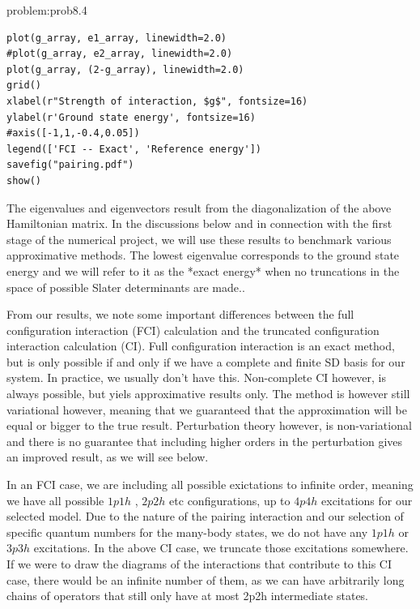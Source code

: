 \begin{sol}{problem:prob8.4}
\begin{lstlisting}
plot(g_array, e1_array, linewidth=2.0)
#plot(g_array, e2_array, linewidth=2.0)
plot(g_array, (2-g_array), linewidth=2.0)
grid()
xlabel(r"Strength of interaction, $g$", fontsize=16)
ylabel(r'Ground state energy', fontsize=16)
#axis([-1,1,-0.4,0.05])
legend(['FCI -- Exact', 'Reference energy'])
savefig("pairing.pdf")
show()
\end{lstlisting}
The eigenvalues and eigenvectors result from the diagonalization of the above Hamiltonian matrix.
In the discussions below and in connection with the first stage of the numerical project, we will use these results to benchmark various approximative methods.
The lowest eigenvalue corresponds to the ground state
energy and we will refer to it as the *exact energy* when no truncations in the space of possible Slater determinants are made..

From our results, we note some important differences between the full configuration interaction (FCI)
calculation and the truncated configuration interaction calculation (CI).
Full configuration interaction is an exact method, but is only
possible if and only if we have a complete and finite SD basis for our
system. In practice, we usually don't have this. Non-complete
CI however, is always possible, but yiels   approximative
results only. The method is however still variational however, meaning that we
guaranteed that the approximation will be equal or bigger to the true
result.
Perturbation theory however, is non-variational and there is no guarantee that including higher orders in the
perturbation gives an improved result, as we will see below.

In an FCI case, we are including all possible exictations to infinite
order, meaning we have all possible $1p1h$ , $2p2h$ etc configurations, up to $4p4h$
excitations for our selected model. Due to the nature of the pairing interaction and our selection
of specific quantum numbers for the many-body states, we do not have any $1p1h$ or $3p3h$ excitations.
In the above CI case, we truncate those excitations somewhere.
If we
were to draw the diagrams of the interactions that contribute to this
CI case, there would be an infinite number of them, as we can have
arbitrarily long chains of operators that still only have at most 2p2h
intermediate states.
\end{sol}

